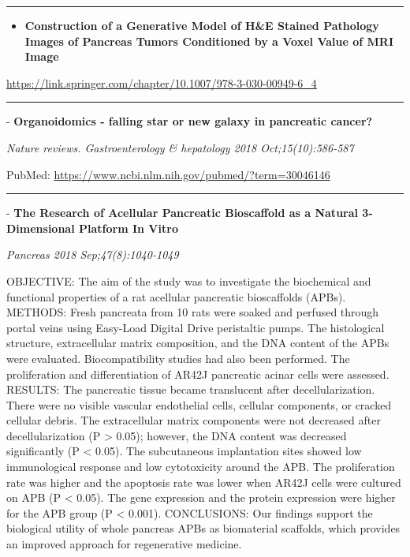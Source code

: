 \documentclass[]{article}
\providecommand{\tightlist}{%
  \setlength{\itemsep}{0pt}\setlength{\parskip}{0pt}}
\begin{document}
\begin{center}\rule{0.5\linewidth}{\linethickness}\end{center}

\begin{itemize}
\tightlist
\item
  \textbf{Construction of a Generative Model of H\&E Stained Pathology
  Images of Pancreas Tumors Conditioned by a Voxel Value of MRI Image}
\end{itemize}

\url{https://link.springer.com/chapter/10.1007/978-3-030-00949-6_4}

\begin{center}\rule{0.5\linewidth}{\linethickness}\end{center}

 - \textbf{Organoidomics - falling star or new galaxy in pancreatic
cancer?}

\emph{Nature reviews. Gastroenterology \& hepatology 2018
Oct;15(10):586-587}

PubMed: \url{https://www.ncbi.nlm.nih.gov/pubmed/?term=30046146}

{}

{}

\begin{center}\rule{0.5\linewidth}{\linethickness}\end{center}

 - \textbf{The Research of Acellular Pancreatic Bioscaffold as a Natural
3-Dimensional Platform In Vitro}

\emph{Pancreas 2018 Sep;47(8):1040-1049}

OBJECTIVE: The aim of the study was to investigate the biochemical and
functional properties of a rat acellular pancreatic bioscaffolds (APBs).
METHODS: Fresh pancreata from 10 rats were soaked and perfused through
portal veins using Easy-Load Digital Drive peristaltic pumps. The
histological structure, extracellular matrix composition, and the DNA
content of the APBs were evaluated. Biocompatibility studies had also
been performed. The proliferation and differentiation of AR42J
pancreatic acinar cells were assessed. RESULTS: The pancreatic tissue
became translucent after decellularization. There were no visible
vascular endothelial cells, cellular components, or cracked cellular
debris. The extracellular matrix components were not decreased after
decellularization (P \textgreater{} 0.05); however, the DNA content was
decreased significantly (P \textless{} 0.05). The subcutaneous
implantation sites showed low immunological response and low
cytotoxicity around the APB. The proliferation rate was higher and the
apoptosis rate was lower when AR42J cells were cultured on APB (P
\textless{} 0.05). The gene expression and the protein expression were
higher for the APB group (P \textless{} 0.001). CONCLUSIONS: Our
findings support the biological utility of whole pancreas APBs as
biomaterial scaffolds, which provides an improved approach for
regenerative medicine.
\end{document}
